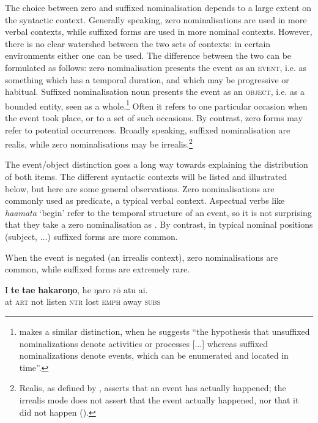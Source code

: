 The choice between zero and suffixed nominalisation depends to a large extent on the syntactic context. Generally speaking, zero nominalisations are used in more verbal contexts, while suffixed forms are used in more nominal contexts. However, there is no clear watershed between the two sets of contexts: in certain environments either one can be used. The difference between the two can be formulated as follows: zero nominalisation presents the event as an \textsc{event}, i.e. as something which has a temporal duration, and which may be progressive or habitual. Suffixed nominalisation noun presents the event as an \textsc{object}, i.e. as a bounded entity, seen as a whole.\footnote{\label{fn:105}\citet[79]{Clark1981} makes a similar distinction, when he suggests “the hypothesis that unsuffixed nominalizations denote activities or processes [...] whereas suffixed nominalizations denote events, which can be enumerated and located in time”.} Often it refers to one particular occasion when the event took place, or to a set of such occasions. By contrast, zero forms may refer to potential occurrences. Broadly speaking, suffixed nominalisation are realis, while zero nominalisations may be irrealis.\footnote{\label{fn:106}Realis, as defined by \citet[244]{Payne1997}, asserts that an event has actually happened; the irrealis mode does not assert that the event actually happened, nor that it did not happen ().}

The event/object distinction goes a long way towards explaining the distribution of both items. The different syntactic contexts will be listed and illustrated below, but here are some general observations. Zero nominalisations are commonly used as  predicate, a typical verbal context. Aspectual verbs like \textit{ha{\ꞌ}amata} ‘begin’ refer to the temporal structure of an event, so it is not surprising that they take a zero nominalisation as . By contrast, in typical nominal positions (subject, ...) suffixed forms are more common. 

When the event is negated (an irrealis context), zero nominalisations are common, while suffixed forms are extremely rare. 

\ea\label{ex:3.17}
\gll {\ꞌ}I \textbf{te} \textbf{ta{\ꞌ}e} \textbf{hakaroŋo}, he ŋaro rō atu {\ꞌ}ai. \\
at \textsc{art} not listen \textsc{ntr} lost \textsc{emph} away \textsc{subs} \\

